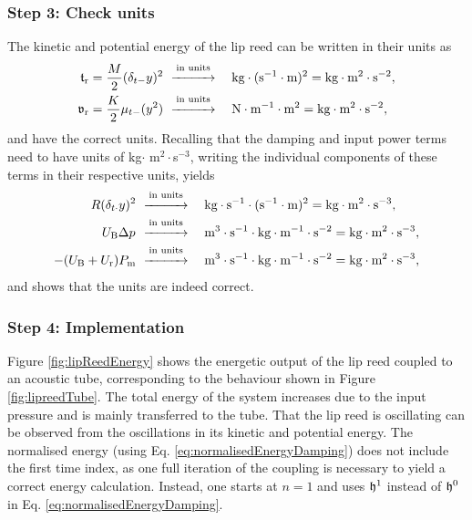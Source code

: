 \subsubsection{Step 3: Check units}
The kinetic and potential energy of the lip reed can be written in their units as
\begin{align*}
    \mathfrak{t}_{\text{r}} = \frac{M}{2}(\delta_{t-}y)^2 &\ \overset{\text{in units}}{\xrightarrow{\hspace*{1cm}}} \quad\text{kg}\cdot(\text{s}^{-1}\cdot \text{m})^{2}= \text{kg}\cdot\text{m}^2\cdot\text{s}^{-2},\\
    \mathfrak{v}_{\text{r}} = \frac{K}{2}\mu_{t-}(y^2)&\ \overset{\text{in units}}{\xrightarrow{\hspace*{1cm}}} \quad \text{N} \cdot \text{m}^{-1} \cdot \text{m}^2 = \text{kg}\cdot\text{m}^2\cdot\text{s}^{-2},
\end{align*}
and have the correct units. Recalling that the damping and input power terms need to have units of kg$\cdot$ m$^2 \cdot $s$^{-3}$, writing the individual components of these terms in their respective units, yields
\begin{align*}
    R(\delta_{t\cdot} y)^2 &\ \overset{\text{in units}}{\xrightarrow{\hspace*{1cm}}} \quad\text{kg}\cdot\text{s}^{-1}\cdot(\text{s}^{-1}\cdot \text{m})^{2} = \text{kg} \cdot \text{m}^2 \cdot \text{s}^{-3} ,\\
    U_\text{B}\Delta p^{}&\ \overset{\text{in units}}{\xrightarrow{\hspace*{1cm}}} \quad \text{m}^3 \cdot \text{s}^{-1}\cdot \text{kg}\cdot \text{m}^{-1}\cdot \text{s}^{-2}= \text{kg} \cdot \text{m}^2 \cdot \text{s}^{-3},\\
    -(U_{\text{B}} + U_{\text{r}})P_{\text{m}}&\ \overset{\text{in units}}{\xrightarrow{\hspace*{1cm}}} \quad \text{m}^3 \cdot \text{s}^{-1}\cdot \text{kg}\cdot \text{m}^{-1}\cdot \text{s}^{-2}= \text{kg} \cdot \text{m}^2 \cdot \text{s}^{-3},
\end{align*}
and shows that the units are indeed correct.
\subsubsection{Step 4: Implementation}
Figure \ref{fig:lipReedEnergy} shows the energetic output of the lip reed coupled to an acoustic tube, corresponding to the behaviour shown in Figure \ref{fig:lipreedTube}. The total energy of the system increases due to the input pressure and is mainly transferred to the tube. That the lip reed is oscillating can be observed from the oscillations in its kinetic and potential energy. The normalised energy (using Eq. \eqref{eq:normalisedEnergyDamping}) does not include the first time index, as one full iteration of the coupling is necessary to yield a correct energy calculation. Instead, one starts at $n=1$ and uses $\mathfrak{h}^1$ instead of $\mathfrak{h}^0$ in Eq. \eqref{eq:normalisedEnergyDamping}.

